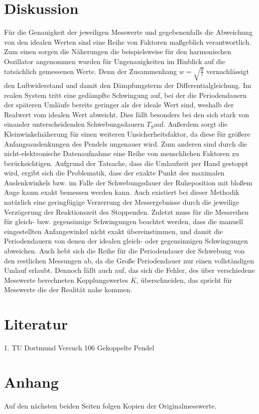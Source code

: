 \section{Diskussion}
\label{sec:Diskussion}
Für die Genauigkeit der jeweiligen Messwerte und gegebenenfalls die Abweichung von den idealen Werten 
sind eine Reihe von Faktoren maßgeblich verantwortlich. \newline 
Zum einen sorgen die Näherungen die beispielsweise für den harmonischen Oszillator angenommen wurden für 
Ungenauigkeiten im Hinblick auf die tatsächlich gemessenen Werte. Denn der Zusammenhang 
$w=\sqrt{\frac{g}{l}}$ vernachlässigt den Luftwiderstand und damit den Dämpfungsterm der 
Differentialgleichung. Im realen System tritt eine gedämpfte Schwingung auf, bei der die 
Periodendauern der späteren Umläufe bereits geringer als der ideale Wert sind, weshalb der 
Realwert vom idealen Wert abweicht. Dies fällt besonders bei den sich stark von einander
unterscheidenden Schwebungsdauern $T_S$auf. Außerdem sorgt die Kleinwinkelnäherung für einen weiteren
 Unsicherheitsfaktor, da diese für größere Anfangsauslenkungen des Pendels ungenauer wird. \newline
Zum anderen sind durch die nicht-elektronische Datenaufnahme eine Reihe von menschlichen Faktoren 
zu berücksichtigen. \newline
Aufgrund der Tatsache, dass die Umlaufzeit per Hand gestoppt wird, ergibt sich die Problematik, 
dass der exakte Punkt des maximalen Auslenkwinkels bzw. im Falle der Schwebungsdauer der Ruheposition 
mit bloßem Auge kaum exakt bemessen werden kann. Auch existiert bei dieser Methodik natürlich eine 
geringfügige Verzerrung der Messergebnisse durch die jeweilige Verzögerung der Reaktionszeit des Stoppenden.
 Zuletzt muss für die Messreihen für gleich- bzw. gegensinnige Schwingungen beachtet werden, dass die 
 manuell eingestellten Anfangswinkel nicht exakt übereinstimmen, und damit die Periodendauern von denen der 
 idealen gleich- oder gegensinnigen Schwingungen abweichen. Auch hebt sich die Reihe für die Periodendauer 
 der Schwebung von den restlichen Messungen ab, da die Große Periodendauer nur einen vollständigen Umlauf 
 erlaubt.
 Dennoch fällt auch auf, das sich die Fehler, des über verschiedene Messwerte berechneten
 Kopplungswertes $K$, überschneiden, das spricht für Messwerte die der Realität nahe kommen.  
\section{Literatur}
1. TU Dortmund Versuch 106 Gekoppelte Pendel\\
\section{Anhang}
Auf den nächsten beiden Seiten folgen Kopien der Originalmesswerte.